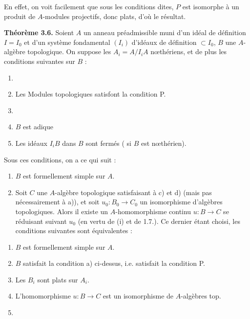 \documentclass[11pt,a4paper]{article}
\begin{document}
En effet, on voit facilement que sous les conditions dites, $P$ est isomorphe
à un produit de $A$-modules projectifs, donc plats, d'où le résultat.


\textbf{Théorème 3.6.} Soient $A$ un anneau préadmissible muni d'un idéal de
définition $I = I_0$ et d'un système fondamental $(I_{i})$ d'idéaux de
définition $\subset I_0$, $B$ une $A$-algèbre topologique. On suppose les
$A_i = A/I_iA$ nœthériens, et de plus les conditions suivantes sur $B$ :

\begin{enumerate}
  \item[a)] 
  \item[a)] Les  Modules topologiques 
     satisfont la condition P.
  \item[b)] 
  \item[c)] $B$ est adique 
  \item[d)] Les idéaux $I_iB$ dans $B$ sont fermés (
     si $B$ est nœthérien).
\end{enumerate}

Sous ces conditions, on a ce qui suit :

\begin{enumerate}
  \item[(i)] $B$ est formellement simple sur $A$.
  \item[(ii)] Soit $C$ une $A$-algèbre topologique satisfaisant à c) et d)
    (mais pas nécessairement à a)), et soit $u_0 : B_0 \to C_0$ un
    isomorphisme d'algèbres topologiques. Alors il existe un
    $A$-homomorphisme continu $u : B \to C$ se réduisant suivant $u_0$ (en
    vertu de (i) et de 1.7.). Ce dernier étant choisi, les conditions
    suivantes sont équivalentes :
\end{enumerate}

\begin{enumerate}
  \item[1)] $B$ est formellement simple sur $A$.
  \item[2)]  $B$ satisfait la condition a) ci-dessus, i.e.
     satisfait la condition P.
  \item[3)] Les $B_i$ sont plats sur $A_i$.
  \item[4)] L'homomorphisme $u : B \to C$ est un isomorphisme de
    $A$-algèbres top.
  \item[5)] 
\end{enumerate}
\end{document}
